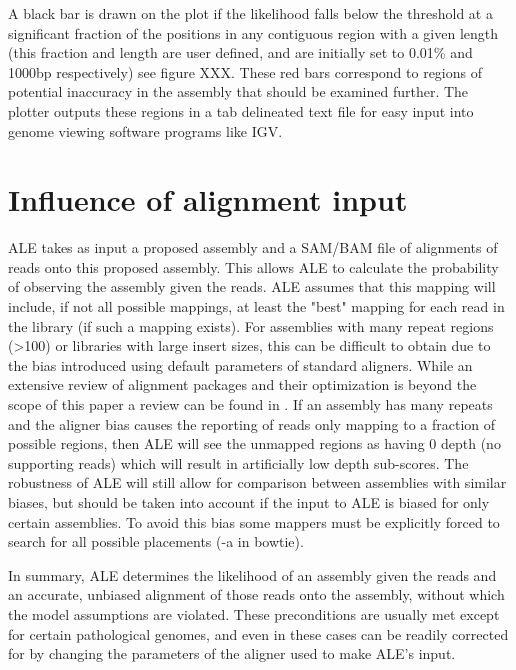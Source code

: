 \documentclass[phd,tocprelim]{cornell}
\begin{document}
A black bar is drawn on the plot if the likelihood falls below the threshold at a significant fraction of the positions in any contiguous region with a given length (this fraction and length are user defined, and are initially set to 0.01\% and 1000bp respectively) see figure XXX. These red bars correspond to regions of potential inaccuracy in the assembly that should be examined further. The plotter outputs these regions in a tab delineated text file for easy input into genome viewing software programs like IGV.


\section{Influence of alignment input} %
\label{sec:Influence of alignment input}

ALE takes as input a proposed assembly and a SAM/BAM \cite{Li2009} file of alignments of reads onto this proposed assembly. This allows ALE to calculate the probability of observing the assembly given the reads. ALE assumes that this mapping will include, if not all possible mappings, at least the "best" mapping for each read in the library (if such a mapping exists). For assemblies with many repeat regions (>100) or libraries with large insert sizes, this can be difficult to obtain due to the bias introduced using default parameters of standard aligners. While an extensive review of alignment packages and their optimization is beyond the scope of this paper a review can be found in \cite{Li2010}. If an assembly has many repeats and the aligner bias causes the reporting of reads only mapping to a fraction of possible regions, then ALE will see the unmapped regions as having 0 depth (no supporting reads) which will result in artificially low depth sub-scores. The robustness of ALE will still allow for comparison between assemblies with similar biases, but should be taken into account if the input to ALE is biased for only certain assemblies. To avoid this bias some mappers must be explicitly forced to search for all possible placements (-a in bowtie).

In summary, ALE determines the likelihood of an assembly given the reads and an accurate, unbiased alignment of those reads onto the assembly, without which the model assumptions are violated. These preconditions are usually met except for certain pathological genomes, and even in these cases can be readily corrected for by changing the parameters of the aligner used to make ALE’s input.
\end{document}
